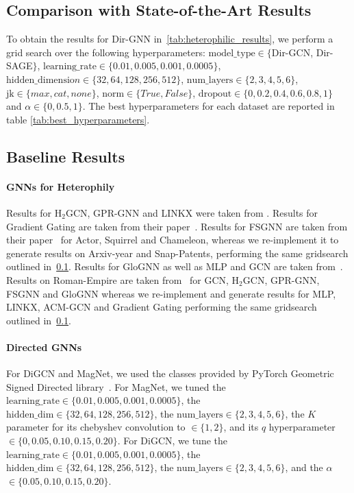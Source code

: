 \documentclass{article}
\theoremstyle{plain}
\theoremstyle{definition}
\theoremstyle{remark}
\begin{document}
\subsection{Comparison with State-of-the-Art Results} \label{sec:appendix_grid_search}

To obtain the results for Dir-GNN in~\cref{tab:heterophilic_results}, we perform a grid search over the following hyperparameters: $\mathrm{model\_type} \in\{$Dir-GCN, Dir-SAGE$\}$, $\mathrm{learning\_rate} \in \{0.01, 0.005, 0.001, 0.0005\}$, $\mathrm{hidden\_dimensio}n \in \{32, 64, 128, 256, 512\}$, $\mathrm{num\_layers} \in \{2, 3, 4, 5, 6\}$, $\mathrm{jk} \in \{max, cat, none\}$, $\mathrm{norm} \in \{True, False \}$, $\mathrm{dropout} \in \{0, 0.2, 0.4, 0.6, 0.8, 1\}$ and $\alpha \in \{0, 0.5, 1\}$. The best hyperparameters for each dataset are reported in table \ref{tab:best_hyperparameters}.

\subsection{Baseline Results} \label{sec:appendix_baseline_results}
\paragraph{GNNs for Heterophily}
Results for H$_2$GCN, GPR-GNN and LINKX were taken from \citeauthor{lim2021large}. Results for Gradient Gating are taken from their paper~\cite{rusch2022gradient}. Results for FSGNN are taken from their paper~\cite{maurya2021improving} for Actor, Squirrel and Chameleon, whereas we re-implement it to generate results on Arxiv-year and Snap-Patents, performing the same gridsearch outlined in~\cref{sec:appendix_grid_search}. Results for GloGNN as well as MLP and GCN are taken from~\citeauthor{li2022finding}. Results on Roman-Empire are taken from~\citet{platonov2023a} for GCN, H$_2$GCN, GPR-GNN, FSGNN and GloGNN whereas we re-implement and generate results for MLP, LINKX, ACM-GCN and Gradient Gating performing the same gridsearch outlined in~\cref{sec:appendix_grid_search}.

\paragraph{Directed GNNs}
For DiGCN and MagNet, we used the classes provided by PyTorch Geometric Signed Directed library~\cite{he2022pytorch}. For MagNet, we tuned the $\mathrm{learning\_rate} \in \{0.01, 0.005, 0.001, 0.0005\}$, the $\mathrm{hidden\_dim} \in \{32, 64, 128, 256, 512\}$, the $\mathrm{num\_layers} \in \{2, 3, 4, 5, 6\}$, the $K$ parameter for its chebyshev convolution to $\in \{1, 2\}$, and its $q$ hyperparameter $\in \{0, 0.05, 0.10, 0.15, 0.20\}$. For DiGCN, we tune the $\mathrm{learning\_rate} \in \{0.01, 0.005, 0.001, 0.0005\}$, the $\mathrm{hidden\_dim} \in \{32, 64, 128, 256, 512\}$, the $\mathrm{num\_layers} \in \{2, 3, 4, 5, 6\}$, and the $\alpha$ $\in \{0.05, 0.10, 0.15, 0.20\}$.
\end{document}
